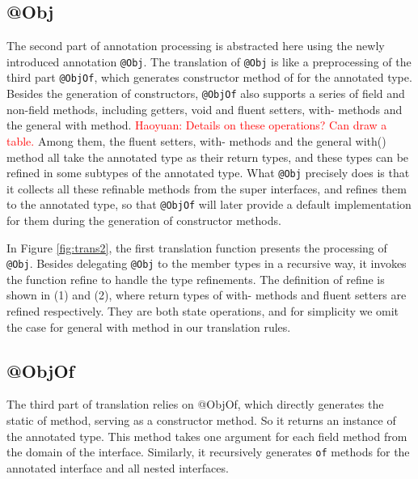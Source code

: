 \subsection{\textsf{@Obj}}
The second part of annotation processing is abstracted here using the newly introduced annotation
\lstinline{@Obj}. The translation of \lstinline{@Obj} is like a preprocessing of the third part \lstinline{@ObjOf},
which generates constructor method \textsf{of} for the annotated type. Besides the generation of constructors, \lstinline{@ObjOf} also supports
a series of field and non-field methods, including getters, void and fluent setters, \textsf{with}- methods and the general \textsf{with} method.
\textcolor{red}{Haoyuan: Details on these operations? Can draw a table.} Among them, the fluent setters, \textsf{with}- methods and the general \textsf{with()} method all take the annotated type as their return types, and these types can be refined in some subtypes of the annotated type. What \lstinline{@Obj} precisely does is that it collects all these refinable methods from the super interfaces, and refines them to the annotated type, so that \lstinline{@ObjOf} will later provide a default implementation for them during the generation of constructor methods.

In Figure \ref{fig:trans2}, the first translation function presents the processing of \lstinline{@Obj}. Besides delegating \lstinline{@Obj} to the member types in a recursive way, it invokes the function \textsf{refine} to handle the type refinements. The definition of \textsf{refine} is shown in (1) and (2), where return types of \textsf{with-} methods and fluent setters are refined respectively. They are both state operations, and for simplicity we omit the case for general \textsf{with} method in our translation rules.

\subsection{\textsf{@ObjOf}}
The third part of translation relies on \textsf{@ObjOf}, which directly generates the static \textsf{of} method, serving as a constructor method. So it returns an instance of the annotated type. This method takes one argument for each field method from the domain of the interface. Similarly, it recursively generates \lstinline{of} methods for the annotated interface and all nested interfaces.

